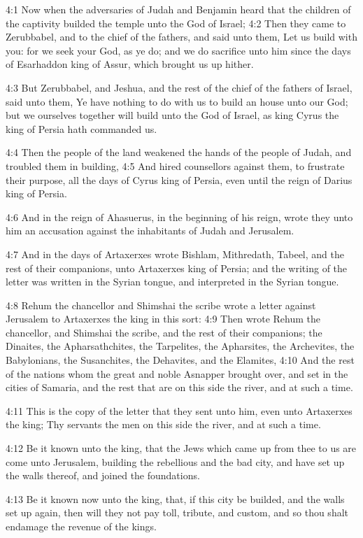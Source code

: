 4:1 Now when the adversaries of Judah and Benjamin heard that the
children of the captivity builded the temple unto the \LORD God of
Israel; 4:2 Then they came to Zerubbabel, and to the chief of the
fathers, and said unto them, Let us build with you: for we seek your
God, as ye do; and we do sacrifice unto him since the days of
Esarhaddon king of Assur, which brought us up hither.

4:3 But Zerubbabel, and Jeshua, and the rest of the chief of the
fathers of Israel, said unto them, Ye have nothing to do with us to
build an house unto our God; but we ourselves together will build unto
the \LORD God of Israel, as king Cyrus the king of Persia hath
commanded us.

4:4 Then the people of the land weakened the hands of the people of
Judah, and troubled them in building, 4:5 And hired counsellors
against them, to frustrate their purpose, all the days of Cyrus king
of Persia, even until the reign of Darius king of Persia.

4:6 And in the reign of Ahasuerus, in the beginning of his reign,
wrote they unto him an accusation against the inhabitants of Judah and
Jerusalem.

4:7 And in the days of Artaxerxes wrote Bishlam, Mithredath, Tabeel,
and the rest of their companions, unto Artaxerxes king of Persia; and
the writing of the letter was written in the Syrian tongue, and
interpreted in the Syrian tongue.

4:8 Rehum the chancellor and Shimshai the scribe wrote a letter
against Jerusalem to Artaxerxes the king in this sort: 4:9 Then wrote
Rehum the chancellor, and Shimshai the scribe, and the rest of their
companions; the Dinaites, the Apharsathchites, the Tarpelites, the
Apharsites, the Archevites, the Babylonians, the Susanchites, the
Dehavites, and the Elamites, 4:10 And the rest of the nations whom the
great and noble Asnapper brought over, and set in the cities of
Samaria, and the rest that are on this side the river, and at such a
time.

4:11 This is the copy of the letter that they sent unto him, even unto
Artaxerxes the king; Thy servants the men on this side the river, and
at such a time.

4:12 Be it known unto the king, that the Jews which came up from thee
to us are come unto Jerusalem, building the rebellious and the bad
city, and have set up the walls thereof, and joined the foundations.

4:13 Be it known now unto the king, that, if this city be builded, and
the walls set up again, then will they not pay toll, tribute, and
custom, and so thou shalt endamage the revenue of the kings.

